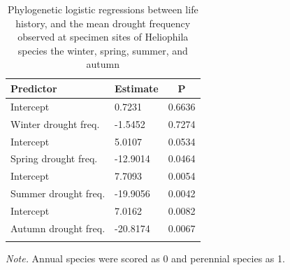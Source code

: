 \documentclass[man,floatsintext]{apa6}
\theoremstyle{definition}
\theoremstyle{definition}
\theoremstyle{definition}
\theoremstyle{remark}
\begin{document}
\begin{table}[tbp]
\begin{center}
\begin{threeparttable}
\caption{\label{tab:modelstable}Phylogenetic logistic regressions between life history, and the mean drought frequency observed at specimen sites of Heliophila species the winter, spring, summer, and autumn}
\begin{tabular}{lll}
\toprule
Predictor & \multicolumn{1}{c}{Estimate} & \multicolumn{1}{c}{P}\\
\midrule
Intercept & 0.7231 & 0.6636\\
Winter drought freq. & -1.5452 & 0.7274\\ \midrule
Intercept & 5.0107 & 0.0534\\
Spring drought freq. & -12.9014 & 0.0464\\ \midrule
Intercept & 7.7093 & 0.0054\\
Summer drought freq. & -19.9056 & 0.0042\\ \midrule
Intercept & 7.0162 & 0.0082\\
Autumn drought freq. & -20.8174 & 0.0067\\ \midrule
\bottomrule
\addlinespace
\end{tabular}
\begin{tablenotes}[para]
\normalsize{\textit{Note.} Annual species were scored as 0 and perennial species as 1.}
\end{tablenotes}
\end{threeparttable}
\end{center}
\end{table}
\end{document}
